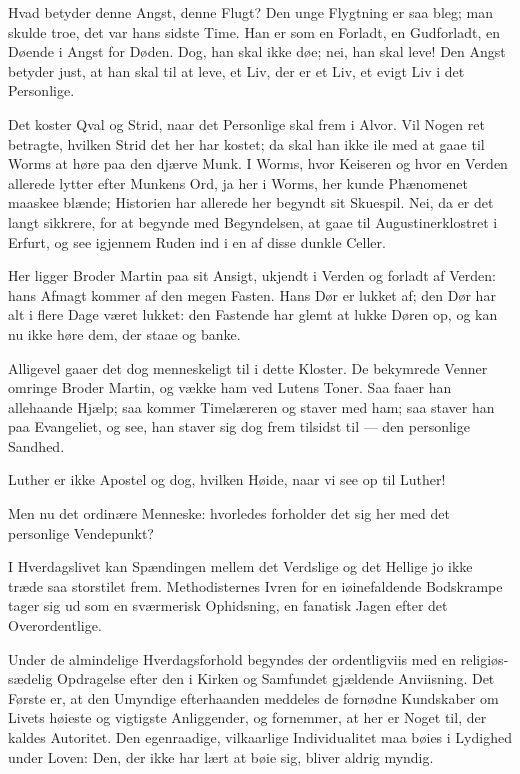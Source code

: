 \documentclass[12pt,a4paper]{book}
\newcommand{\apage}[1]{\marginnote{\footnotesize\textit{[#1]}}}
\begin{document}
Hvad betyder denne Angst, denne Flugt? Den unge Flygtning er saa bleg; man
skulde troe, det var hans sidste Time. Han er som en Forladt, en
Gudforladt, en Døende i Angst for Døden. Dog, han skal ikke døe; nei, han
skal leve! Den Angst betyder just, at han skal til at leve, et Liv, der
er et Liv, et evigt Liv i det Personlige.

Det koster Qval og Strid, naar det Personlige skal frem i Alvor. Vil
Nogen ret betragte, hvilken Strid det her har kostet; da skal han ikke
ile med at gaae til Worms at høre paa den djærve Munk. I Worms, hvor
Keiseren og hvor en Verden allerede lytter efter Munkens Ord, ja her i
Worms, her kunde Phænomenet maaskee blænde; Historien har allerede her
begyndt sit Skuespil. Nei, da er det langt sikkrere, for at begynde med
Begyndelsen, at gaae til Augustinerklostret i Erfurt, og see igjennem
Ruden ind i en af disse dunkle Celler.

Her ligger Broder Martin paa sit Ansigt, ukjendt i Verden og forladt af
Verden: hans Afmagt kommer af den megen \apage{122}
Fasten. Hans Dør er lukket af; den Dør har alt i flere Dage været lukket:
den Fastende har glemt at lukke Døren op, og kan nu ikke høre dem, der
staae og banke.

Alligevel gaaer det dog menneskeligt til i dette Kloster. De bekymrede
Venner omringe Broder Martin, og vække ham ved Lutens Toner. Saa faaer han
allehaande Hjælp; saa kommer Timelæreren og staver med ham; saa staver han
paa Evangeliet, og see, han staver sig dog frem tilsidst til — den
personlige Sandhed.

Luther er ikke Apostel og dog, hvilken Høide, naar vi see op til Luther!

Men nu det ordinære Menneske: hvorledes forholder det sig her med det
personlige Vendepunkt?

I Hverdagslivet kan Spændingen mellem det Verdslige og det Hellige jo
ikke træde saa storstilet frem. Methodisternes Ivren for en
iøinefaldende Bodskrampe tager sig ud som en sværmerisk Ophidsning, en
fanatisk Jagen efter det Overordentlige.

Under de almindelige Hverdagsforhold begyndes der ordentligviis med en
religiøs-sædelig Opdragelse efter den i Kirken og Samfundet gjældende
Anviisning. Det Første er, at den Umyndige efterhaanden meddeles de
fornødne Kundskaber om Livets høieste og vigtigste Anliggender, og
fornemmer, at her er Noget til, der kaldes Autoritet. Den egenraadige,
vilkaarlige Individualitet maa bøies i Lydighed under Loven: Den, der
ikke har lært at bøie sig, bliver aldrig myndig.
\end{document}
